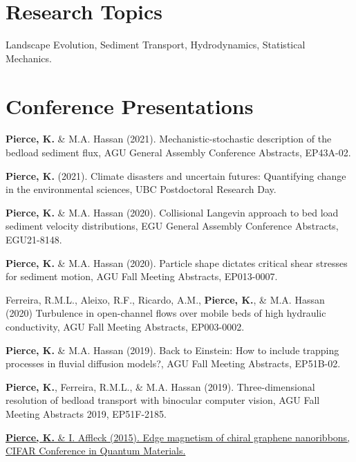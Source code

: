 \documentclass[11pt,letterpaper]{article}
\renewenvironment{itemize}{
	\begin{list}{}{
			\setlength{\leftmargin}{1.5em}
			\setlength{\rightmargin}{0em}  %
			\setlength{\itemsep}{0.25em}
			\setlength{\parskip}{0pt}
			\setlength{\parsep}{0.25em}
		}
	}{
	\end{list}
}
\renewenvironment{itemize}{
	\begin{list}{}{
			\setlength{\leftmargin}{1.5em}
			\setlength{\itemsep}{0.25em}
			\setlength{\parskip}{0pt}
			\setlength{\parsep}{0.25em}
		}
	}{
	\end{list}
}
\begin{document}
	\section*{Research Topics}
	
	Landscape Evolution, Sediment Transport, Hydrodynamics, Statistical Mechanics.



\section*{Conference Presentations}

	\begin{itemize}
		\item \textbf{Pierce, K.} \& M.A. Hassan (2021). Mechanistic-stochastic description of the bedload sediment flux, AGU General Assembly Conference Abstracts, EP43A-02.

		\item \textbf{Pierce, K.} (2021). Climate disasters and uncertain futures: Quantifying change in the environmental sciences, UBC Postdoctoral Research Day.
		
		\item \textbf{Pierce, K.} \& M.A. Hassan (2020). Collisional Langevin approach to bed load sediment velocity distributions, EGU General Assembly Conference Abstracts, EGU21-8148.
		
		\item \textbf{Pierce, K.} \& M.A. Hassan (2020). Particle shape dictates critical shear stresses for sediment motion, AGU Fall Meeting Abstracts, EP013-0007.
		
		\item Ferreira, R.M.L., Aleixo, R.F., Ricardo, A.M., \textbf{Pierce, K.}, \& M.A. Hassan (2020) Turbulence in open-channel flows over mobile beds of high hydraulic conductivity, AGU Fall Meeting Abstracts, EP003-0002.
		
		\item \textbf{Pierce, K.} \& M.A. Hassan (2019). Back to Einstein: How to include trapping processes in fluvial diffusion models?, AGU Fall Meeting Abstracts, EP51B-02.
		
		\item \textbf{Pierce, K.}, Ferreira, R.M.L., \& M.A. Hassan (2019). Three-dimensional resolution of bedload transport with binocular computer vision, AGU Fall Meeting Abstracts 2019, EP51F-2185.
		
		\item \href{https://www.osapublishing.org/ol/abstract.cfm?uri=ol-37-5-788}{\textbf{Pierce, K.} \& I. Affleck (2015). Edge magnetism of chiral graphene nanoribbons, CIFAR Conference in Quantum Materials.}
	\end{itemize}
\end{document}
